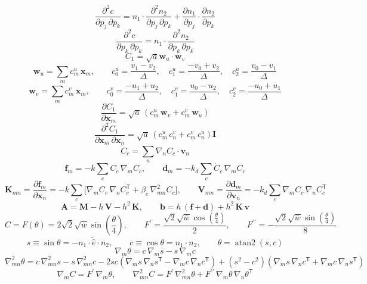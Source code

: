 \[ \frac{\partial^2 c}{\partial p_{j}\,\partial p_{k}} = n_1 \cdot \frac{\partial^{2} n_2}{\partial p_{j}\,\partial p_{k}} + \frac{\partial n_1}{\partial p_{j}} \cdot \frac{\partial n_2}{\partial p_{k}} \]
\[ \frac{\partial^2 c}{\partial p_{k}\,\partial p_{k}} = n_1 \cdot \frac{\partial^{2} n_2}{\partial p_{k}\,\partial p_{k}} \]
\[ C_{1} = \sqrt{a} \mathbf{w}_u\cdot\mathbf{w}_v \]
\[ \mathbf{w}_u = \sum_m c^{u}_{m}\,\mathbf{x}_m,\qquad c^{u}_{0} = \frac{v_{1} - v_{2}}{\Delta},\quad c^{u}_{1} = \frac{- v_{0} + v_{2}}{\Delta},\quad c^{u}_{2} = \frac{v_{0} - v_{1}}{\Delta} \]
\[ \mathbf{w}_v = \sum_m c^{v}_{m}\,\mathbf{x}_m,\qquad c^{v}_{0} = \frac{- u_{1} + u_{2}}{\Delta},\quad c^{v}_{1} = \frac{u_{0} - u_{2}}{\Delta},\quad c^{v}_{2} = \frac{- u_{0} + u_{1}}{\Delta} \]
\[ \frac{\partial C_{1}}{\partial \mathbf{x}_m} = \sqrt{a}\,\left(c^{u}_{m}\,\mathbf{w}_v + c^{v}_{m}\,\mathbf{w}_u\right) \]
\[ \frac{\partial^2 C_{1}}{\partial \mathbf{x}_m\,\partial \mathbf{x}_n} = \sqrt{a}\,\left(c^{u}_{m}\,c^{v}_{n} + c^{v}_{m}\,c^{u}_{n}\right)\mathbf{I} \]
\[ \dot C_c = \sum_n \nabla_n C_c\cdot\mathbf{v}_n \]
\[ \mathbf{f}_m = -k\sum_c C_c\,\nabla_m C_c,\qquad \mathbf{d}_m = -k_d\sum_c \dot C_c\,\nabla_m C_c \]
\[ \mathbf{K}_{mn} = \frac{\partial \mathbf{f}_m}{\partial \mathbf{x}_n} = -k\sum_c\Big[\nabla_m C_c\,\nabla_n C_c^{\mathsf T} + \beta_c\,\nabla^2_{mn} C_c\Big],\qquad \mathbf{V}_{mn} = \frac{\partial \mathbf{d}_m}{\partial \mathbf{v}_n} = -k_d\sum_c \nabla_m C_c\,\nabla_n C_c^{\mathsf T} \]
\[ \mathbf{A} = \mathbf{M} - h\,\mathbf{V} - h^2\,\mathbf{K},\qquad \mathbf{b} = h\,(\mathbf{f} + \mathbf{d}) + h^2\,\mathbf{K}\,\mathbf{v} \]
\[ C = F(\theta) = 2 \sqrt{2} \sqrt{\bar{w}} \sin{\left(\frac{\theta}{4} \right)},\qquad F^\prime = \frac{\sqrt{2} \sqrt{\bar{w}} \cos{\left(\frac{\theta}{4} \right)}}{2},\qquad F^{\prime\prime} = - \frac{\sqrt{2} \sqrt{\bar{w}} \sin{\left(\frac{\theta}{4} \right)}}{8} \]
\[ s \equiv \sin\theta = - n_1 \cdot \tilde{\hat{e}} \cdot n_2,\qquad c \equiv \cos\theta = n_1 \cdot n_2,\qquad \theta = \operatorname{atan2}(s, c) \]
\[ \nabla_m \theta = c\,\nabla_m s - s\,\nabla_m c \]
\[ \nabla^2_{mn} \theta = c\,\nabla^2_{mn} s - s\,\nabla^2_{mn} c - 2sc\left(\nabla_m s\,\nabla_n s^{\mathsf T} - \nabla_m c\,\nabla_n c^{\mathsf T}\right) + (s^2 - c^2)\left(\nabla_m s\,\nabla_n c^{\mathsf T} + \nabla_m c\,\nabla_n s^{\mathsf T}\right) \]
\[ \nabla_m C = F^\prime\,\nabla_m\theta,\qquad \nabla^2_{mn} C = F^\prime\,\nabla^2_{mn}\theta + F^{\prime\prime}\,\nabla_m\theta\,\nabla_n\theta^{\mathsf T} \]
